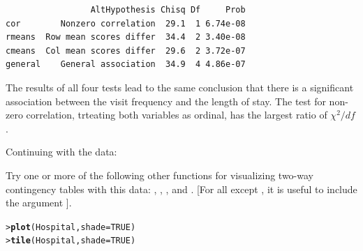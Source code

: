 \documentclass[10pt]{report}\usepackage[]{graphicx}\usepackage[]{color}
\makeatletter
\newcommand{\hlnum}[1]{\textcolor[rgb]{0.686,0.059,0.569}{#1}}%
\newcommand{\hlstd}[1]{\textcolor[rgb]{0.345,0.345,0.345}{#1}}%
\newcommand{\hlkwc}[1]{\textcolor[rgb]{0.333,0.667,0.333}{#1}}%
\newcommand{\hlkwd}[1]{\textcolor[rgb]{0.737,0.353,0.396}{\textbf{#1}}}%
\newenvironment{kframe}{%
 \def\at@end@of@kframe{}%
 \ifinner\ifhmode%
  \def\at@end@of@kframe{\end{minipage}}%
  \begin{minipage}{\columnwidth}%
 \fi\fi%
 \def\FrameCommand##1{\hskip\@totalleftmargin \hskip-\fboxsep
 \colorbox{shadecolor}{##1}\hskip-\fboxsep
     \hskip-\linewidth \hskip-\@totalleftmargin \hskip\columnwidth}%
 \MakeFramed {\advance\hsize-\width
   \@totalleftmargin\z@ \linewidth\hsize
   \@setminipage}}%
 {\par\unskip\endMakeFramed%
 \at@end@of@kframe}
\newenvironment{knitrout}{}{} %
\renewenvironment{knitrout}{\small\renewcommand{\baselinestretch}{.85}}{} %
\makeatother
\begin{document}
\begin{Exercises}
\begin{enumerate*}
\begin{ans}
\begin{knitrout}
\begin{kframe}
\begin{verbatim}
                 AltHypothesis Chisq Df     Prob
cor        Nonzero correlation  29.1  1 6.74e-08
rmeans  Row mean scores differ  34.4  2 3.40e-08
cmeans  Col mean scores differ  29.6  2 3.72e-07
general    General association  34.9  4 4.86e-07
\end{verbatim}
\end{kframe}
\end{knitrout}
      The results of all four tests lead to the same conclusion that there is a
      significant association between the visit frequency and the length of stay.
      The test for non-zero correlation, trteating both variables as ordinal, has the
      largest ratio of $\chi^2 /df$.
      \end{ans}
      
    \end{enumerate*}

  \exercise Continuing with the  data:
    \begin{enumerate*}
      \item Try one or more of the following other functions for visualizing two-way contingency tables with this data: 
      , , , and .  
      [For all except , it is useful to include the argument ].
      \begin{ans}
\begin{knitrout}\footnotesize
{}\color{fgcolor}\begin{kframe}
\begin{alltt}
\hlstd{> }\hlkwd{plot}\hlstd{(Hospital,} \hlkwc{shade}\hlstd{=}\hlnum{TRUE}\hlstd{)}
\hlstd{> }\hlkwd{tile}\hlstd{(Hospital,} \hlkwc{shade}\hlstd{=}\hlnum{TRUE}\hlstd{)}
\end{alltt}
\end{kframe}


\end{knitrout}
\end{ans}
\end{enumerate*}
\end{Exercises}
\end{document}

